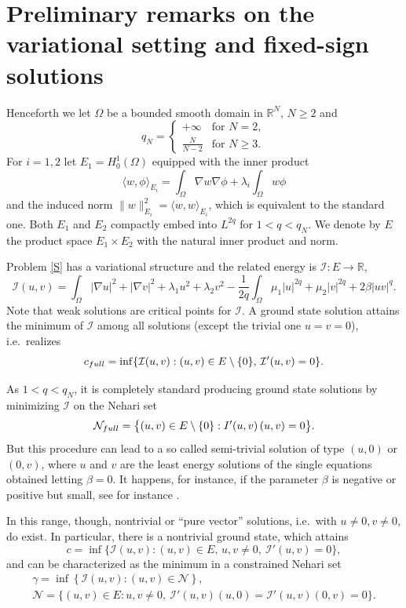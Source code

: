 \documentclass[10pt,a4paper]{amsart}
\numberwithin{equation}{section}
\begin{document}
\section{Preliminary remarks on the variational setting and fixed-sign
solutions}\label{sec1}

Henceforth we let $\Omega$ be a bounded smooth domain in $\mathbb{R}^N$, $N\ge 2$ and
\[
q_N= \begin{cases} +\infty & \text{for } N=2,\\
\frac{N}{N-2} &\text{for } N\ge 3 .
\end{cases}
\]
For $i=1,2$ let $E_1=H^1_0(\Omega)$ equipped with the inner product
\[
\langle w,\phi \rangle_{E_i}
= \int_{\Omega} \nabla w \nabla \phi  +\lambda_i \int_{\Omega} w \phi
 \]
and the induced norm $ \|w\|_{E_i}^2=\langle w,w\rangle_{E_i}$,
which is equivalent to the standard one.
Both $E_1$ and $E_2$ compactly embed into $L^{2q}$ for $1<q<q_N$.
We denote by  $E$ the product space $E_1\times E_2$ with the natural inner product
and norm.

Problem \eqref{S} has a variational structure and the related energy is
$\mathcal I: E \to \mathbb{R}$,
\begin{equation} \label{energy}
\mathcal{I}(u,v) = \int_{\Omega} |\nabla u|^2 + | \nabla v|^2 + \lambda_1 u^2
+ \lambda_2 v^2   - \frac{1}{2q}\int_{\Omega} \mu_1 |u|^{2q}
+ \mu_2 |v|^{2q} + 2\beta |uv|^q .
\end{equation}
Note that weak solutions are critical points for $\mathcal I$.
A ground state solution attains the minimum of $\mathcal I$ among all solutions
(except the trivial one $u=v=0$), i.e.\ realizes
\[
c_{\rm full}=\inf\{ \mathcal I(u,v)  :  (u,v)\in E\setminus\{0\}, \,
 \mathcal I'(u,v)=0\}.
 \]

As $1< q< q_N$, it is completely standard producing ground state solutions by
minimizing $\mathcal I$ on the Nehari set
\begin{equation}\label{def:Nehari0}
 {\mathcal N}_{\rm full} = \big\{ (u,v)\in E\setminus\{0\} :
   I'(u,v) \, (u,v) =0 \big\}.
\end{equation}
But this procedure can lead to a so called semi-trivial solution of type
$(u,0)$ or $(0,v)$, where $u$ and $v$ are the least energy  solutions of the
single equations obtained letting $\beta=0$.
It happens, for instance, if the parameter $\beta$ is negative or positive but small,
see for instance \cite{BW_JDE06}.

In this range, though, nontrivial or ``pure vector'' solutions, i.e.\
 with $u\neq 0, v\neq 0$, do exist.
In particular, there is a nontrivial ground state, which attains
\begin{equation}\label{def:c}
  c=\inf\{ \mathcal I(u,v) : (u,v)\in E, \, u, v \neq 0,  \ \mathcal I'(u,v)=0\} ,
\end{equation}
and can be characterized as the minimum in a constrained Nehari set
\begin{gather} \label{def:gamma}
 \gamma= \inf\left\{ \mathcal I(u,v) : (u,v)\in \mathcal N\right\} , \\
\label{def:Neharivec}
\mathcal N=   \{ (u,v)\in E: u,v\neq 0, \ \mathcal I'(u,v)(u,0)= \mathcal I'(u,v)
(0,v)=0 \}.
\end{gather}
\end{document}
